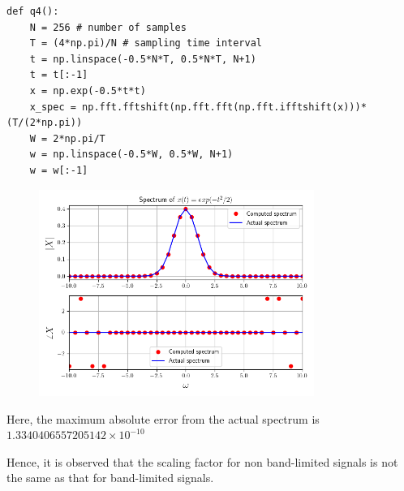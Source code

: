 \documentclass[12pt, a4paper]{article}
\begin{document}
\begin{lstlisting}
def q4():
    N = 256 # number of samples
    T = (4*np.pi)/N # sampling time interval
    t = np.linspace(-0.5*N*T, 0.5*N*T, N+1)
    t = t[:-1]
    x = np.exp(-0.5*t*t)
    x_spec = np.fft.fftshift(np.fft.fft(np.fft.ifftshift(x)))*(T/(2*np.pi))
    W = 2*np.pi/T
    w = np.linspace(-0.5*W, 0.5*W, N+1)
    w = w[:-1]
\end{lstlisting}

\begin{figure}[H]
\centering
\includegraphics[width=0.8\textwidth]{q4_4.png}
\end{figure}

Here, the maximum absolute error from the actual spectrum is $1.3340406557205142 \times 10^{-10}$

Hence, it is observed that the scaling factor for non band-limited signals is not the same as that for band-limited signals.
\end{document}
